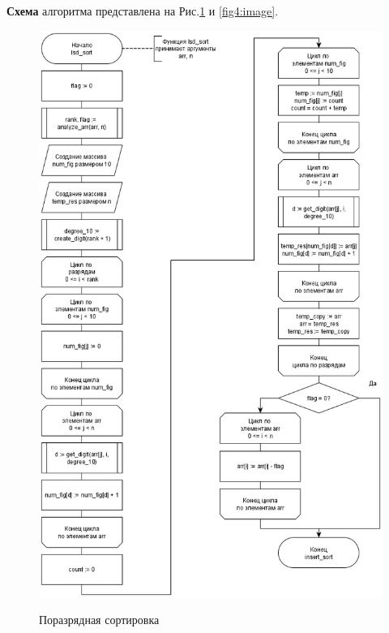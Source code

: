 \textbf{Схема} алгоритма представлена на Рис.\ref{fig3:image} и \ref{fig4:image}.
\begin{figure}[h]
	\begin{center}
		{\includegraphics[scale = 0.57]{schemes/lsd_1}}
		\caption{Поразрядная сортировка}
		\label{fig3:image}
	\end{center}
\end{figure}

